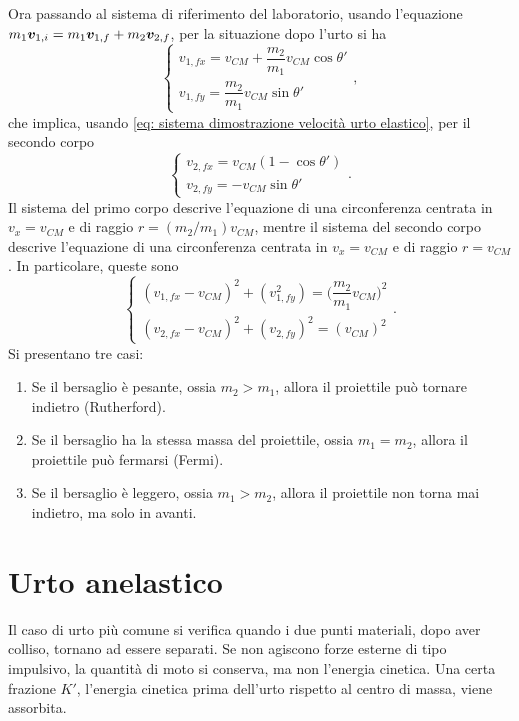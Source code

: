 Ora passando al sistema di riferimento del laboratorio, usando l'equazione $m_1\bm{v}_{1,i}=m_1\bm{v}_{1,f}+m_2\bm{v}_{2,f}$, per la situazione dopo l'urto si ha
\begin{equation}
    \begin{cases}
        v_{1,fx}=v_{CM}+\dfrac{m_2}{m_1}v_{CM}\cos{\theta'} \\
        v_{1,fy}=\dfrac{m_2}{m_1}v_{CM}\sin{\theta'}
    \end{cases},
\end{equation}
che implica, usando \eqref{eq: sistema dimostrazione velocità urto elastico}, per il secondo corpo
\begin{equation}
    \begin{cases}
        v_{2,fx}=v_{CM}(1-\cos{\theta'}) \\
        v_{2,fy}=-v_{CM}\sin{\theta'}
    \end{cases}.
\end{equation}
Il sistema del primo corpo descrive l'equazione di una circonferenza centrata in $v_x=v_{CM}$ e di raggio $r=(m_2/m_1)v_{CM}$, mentre il sistema del secondo corpo descrive l'equazione di una circonferenza centrata in $v_x=v_{CM}$ e di raggio $r=v_{CM}$. In particolare, queste sono
\begin{equation}
    \begin{cases}
        (v_{1,fx}-v_{CM})^2+(v_{1,fy}^2)=\bigg(\dfrac{m_2}{m_1}v_{CM}\bigg)^2 \\[1.5ex]
        (v_{2,fx}-v_{CM})^2+(v_{2,fy})^2=(v_{CM})^2
    \end{cases}.
\end{equation}
Si presentano tre casi:
\begin{enumerate}
    \item Se il bersaglio è pesante, ossia $m_2>m_1$, allora il proiettile può tornare indietro (Rutherford).
    \item Se il bersaglio ha la stessa massa del proiettile, ossia $m_1=m_2$, allora il proiettile può fermarsi (Fermi).
    \item Se il bersaglio è leggero, ossia $m_1>m_2$, allora il proiettile non torna mai indietro, ma solo in avanti.
\end{enumerate}

\section{Urto anelastico}
Il caso di urto più comune si verifica quando i due punti materiali, dopo aver colliso, tornano ad essere separati. Se non agiscono forze esterne di tipo impulsivo, la quantità di moto si conserva, ma non l'energia cinetica. Una certa frazione $K'$, l'energia cinetica prima dell'urto rispetto al centro di massa, viene assorbita. 


